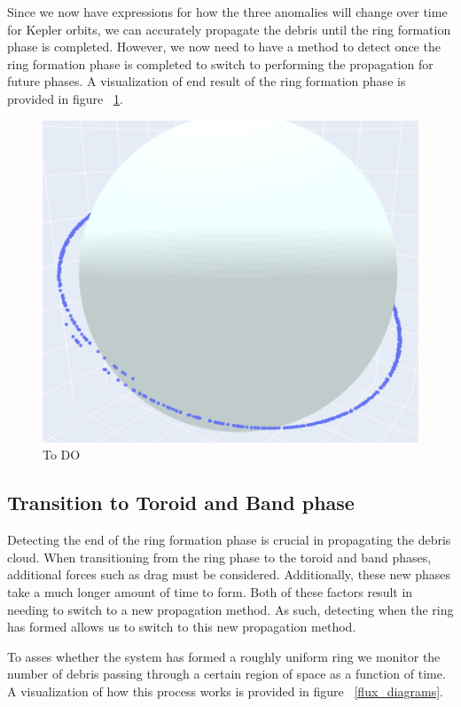 \documentclass[a4paper, 12pt]{article}
\begin{document}
Since we now have expressions for how the three anomalies will change over time for Kepler orbits, we can accurately propagate the debris until the ring formation phase is completed. However, we now need to have a method to detect once the ring formation phase is completed to switch to performing the propagation for future phases. A visualization of end result of the ring formation phase is provided in figure ~\ref{ring}.
\begin{figure}[b!]
	\centering
	\includegraphics[scale=0.45]{ring_phase}
	\caption{To DO }
	\label{ring}
\end{figure}

\subsection{Transition to Toroid and Band phase}

Detecting the end of the ring formation phase is crucial in propagating the debris cloud. When transitioning from the ring phase to the toroid and band phases, additional forces such as drag must be considered. Additionally, these new phases take a much longer amount of time to form. Both of these factors result in needing to switch to a new propagation method. As such, detecting when the ring has formed allows us to switch to this new propagation method.

To asses whether the system has formed a roughly uniform ring we monitor the number of debris passing through a certain region of space as a function of time. A visualization of how this process works is provided in figure ~\ref{flux_diagrams}.
\end{document}
